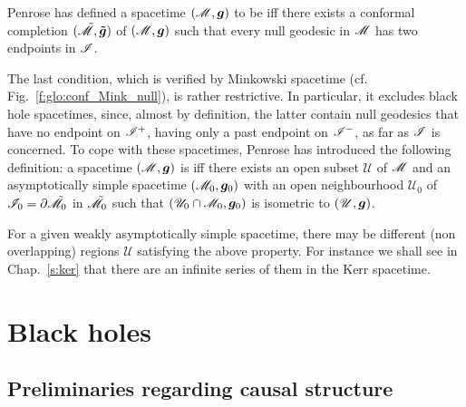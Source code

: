 Penrose \cite{Penro64,Penro68} has defined
a spacetime $(\mathscr{M},\bm{g})$ to be  iff there exists
a conformal completion $(\tilde{\mathscr{M}},\bm{\tilde{g}})$
of $(\mathscr{M},\bm{g})$
such that every null geodesic in $\mathscr{M}$ has two endpoints in $\mathscr{I}$.

The last condition, which is verified by Minkowski spacetime (cf. Fig.~\ref{f:glo:conf_Mink_null}), is rather restrictive. In particular, it excludes
black hole spacetimes, since, almost by definition, the latter contain null
geodesics that have no endpoint on $\mathscr{I}^+$, having only a past endpoint
on $\mathscr{I}^-$, as far as $\mathscr{I}$ is concerned. To cope with these spacetimes,
Penrose \cite{Penro68} has introduced the following definition:
a spacetime $(\mathscr{M},\bm{g})$ is
 iff
there exists an open subset $\mathscr{U}$ of $\mathscr{M}$ and
an asymptotically simple spacetime $(\mathscr{M}_0, \bm{g}_0)$
with an open neighbourhood $\mathscr{U}_0$ of $\mathscr{I}_0 = \partial \tilde{\mathscr{M}}_0$
in $\tilde{\mathscr{M}}_0$ such that $(\mathscr{U}_0\cap \mathscr{M}_0,\bm{g}_0)$ is
isometric to $(\mathscr{U},\bm{g})$.

\begin{remark}
For a given weakly asymptotically simple spacetime, there may be different
(non overlapping) regions $\mathscr{U}$ satisfying the above property.
For instance we shall see in Chap.~\ref{s:ker}
that there are an infinite series of them in the Kerr spacetime.
\end{remark}




\section{Black holes}

\subsection{Preliminaries regarding causal structure}


